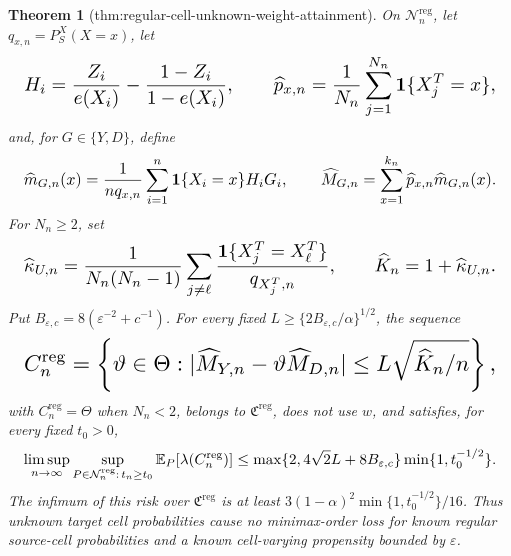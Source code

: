 \documentclass{article}
\newtheorem{theorem}{Theorem}
\begin{document}
\begin{theorem}[thm:regular-cell-unknown-weight-attainment]\label{thm:regular-cell-unknown-weight-attainment}
On \(\mathcal N_n^{\mathrm{reg}}\), let \(q_{x,n}=P_S^X(X=x)\), let
\[
\makebox[\linewidth][c]{\resizebox{0.98\linewidth}{!}{\(\displaystyle H_i=\frac{Z_i}{e(X_i)}-\frac{1-Z_i}{1-e(X_i)},
 \qquad \widehat p_{x,n}=\frac1{N_n}\sum_{j=1}^{N_n}\mathbf 1\{X_j^T=x\},\)}}
\]
and, for \(G\in\{Y,D\}\), define
\[
\makebox[\linewidth][c]{\resizebox{0.98\linewidth}{!}{\(\displaystyle \widehat m_{G,n}(x)=\frac1{nq_{x,n}}\sum_{i=1}^n
 \mathbf 1\{X_i=x\}H_iG_i,
 \qquad
 \widehat M_{G,n}=\sum_{x=1}^{k_n}\widehat p_{x,n}\widehat m_{G,n}(x).\)}}
\]
For \(N_n\ge2\), set
\[
\makebox[\linewidth][c]{\resizebox{0.98\linewidth}{!}{\(\displaystyle \widehat\kappa_{U,n}=
 \frac1{N_n(N_n-1)}\sum_{j\ne\ell}
 \frac{\mathbf 1\{X_j^T=X_\ell^T\}}{q_{X_j^T,n}},
 \qquad \widehat K_n=1+\widehat\kappa_{U,n}.\)}}
\]
Put \(B_{\varepsilon,c}=8(\varepsilon^{-2}+c^{-1})\).  For every fixed \(L\ge\{2B_{\varepsilon,c}/\alpha\}^{1/2}\), the sequence
\[
\makebox[\linewidth][c]{\resizebox{0.98\linewidth}{!}{\(\displaystyle C_n^{\mathrm{reg}}=\left\{\vartheta\in\Theta:
 |\widehat M_{Y,n}-\vartheta\widehat M_{D,n}|
 \le L\sqrt{\widehat K_n/n}\right\},\)}}
\]
with \(C_n^{\mathrm{reg}}=\Theta\) when \(N_n<2\), belongs to \(\mathfrak C^{\mathrm{reg}}\), does not use \(w\), and satisfies, for every fixed \(t_0>0\),
\[
\makebox[\linewidth][c]{\resizebox{0.98\linewidth}{!}{\(\displaystyle \limsup_{n\to\infty}\sup_{P\in\mathcal N_n^{\mathrm{reg}}:\,t_n\ge t_0}
 \mathbb E_P[\lambda(C_n^{\mathrm{reg}})]
 \le \max\{2,4\sqrt2L+8B_{\varepsilon,c}\}
 \min\{1,t_0^{-1/2}\}.\)}}
\]
The infimum of this risk over \(\mathfrak C^{\mathrm{reg}}\) is at least \(3(1-\alpha)^2\min\{1,t_0^{-1/2}\}/16\).  Thus unknown target cell probabilities cause no minimax-order loss for known regular source-cell probabilities and a known cell-varying propensity bounded by \(\varepsilon\).
\end{theorem}
\end{document}
